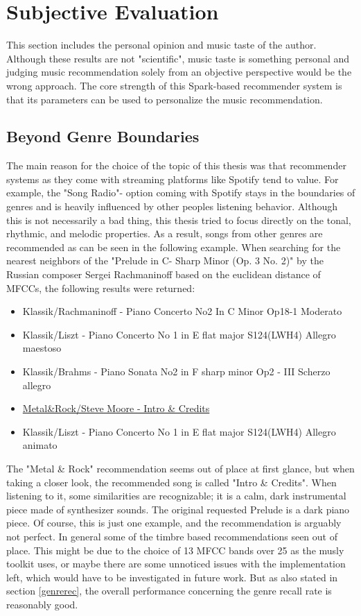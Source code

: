 \section{Subjective Evaluation}

This section includes the personal opinion and music taste of the author. Although these results are not "scientific", music taste is something personal and judging music recommendation solely from an objective perspective would be the wrong approach. The core strength of this Spark-based recommender system is that its parameters can be used to personalize the music recommendation. 

\subsection{Beyond Genre Boundaries}

The main reason for the choice of the topic of this thesis was that recommender systems as they come with streaming platforms like Spotify tend to value. For example, the "Song Radio"- option coming with Spotify stays in the boundaries of genres and is heavily influenced by other peoples listening behavior. Although this is not necessarily a bad thing, this thesis tried to focus directly on the tonal, rhythmic, and melodic properties. As a result, songs from other genres are recommended as can be seen in the following example. 
\noindent When searching for the nearest neighbors of the "Prelude in C- Sharp Minor (Op. 3 No. 2)" by the Russian composer Sergei Rachmaninoff based on the euclidean distance of MFCCs, the following results were returned: 

\begin{itemize}
	\setlength\itemsep{-0.5em}
	\item Klassik/Rachmaninoff - Piano Concerto No2 In C Minor Op18-1 Moderato
	\item Klassik/Liszt - Piano Concerto No 1 in E flat major S124(LWH4) Allegro maestoso
	\item Klassik/Brahms - Piano Sonata No2 in F sharp minor Op2 - III Scherzo allegro
	\item \underline{Metal\&Rock/Steve Moore - Intro \& Credits}
	\item Klassik/Liszt - Piano Concerto No 1 in E flat major S124(LWH4) Allegro animato
\end{itemize}

\noindent The "Metal \& Rock" recommendation seems out of place at first glance, but when taking a closer look, the recommended song is called "Intro \& Credits". When listening to it, some similarities are recognizable; it is a calm, dark instrumental piece made of synthesizer sounds. The original requested Prelude is a dark piano piece. Of course, this is just one example, and the recommendation is arguably not perfect. In general some of the timbre based recommendations seen out of place. This might be due to the choice of 13 MFCC bands over 25 as the musly toolkit uses, or maybe there are some unnoticed issues with the implementation left, which would have to be investigated in future work. But as also stated in section \ref{genrerec}, the overall performance concerning the genre recall rate is reasonably good.


